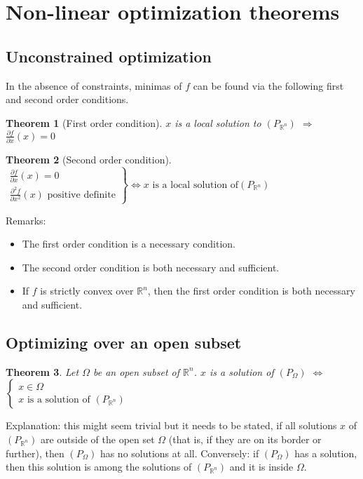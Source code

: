 \documentclass{article}
\newtheorem*{theorem}{Theorem}
\begin{document}
\section{Non-linear optimization theorems}

\subsection{Unconstrained optimization}
In the absence of constraints, minimas of $f$ can be found via the following first and second order conditions.

\begin{theorem}[First order condition]
$x$ is a local solution to $\left(P_{\mathbb{R}^n}\right)$ $\Rightarrow$
$\frac{\partial f}{\partial x}(x) = 0$
\end{theorem}

\begin{theorem}[Second order condition]
\begin{math}
\left.
\begin{array}{l}
\frac{\partial f}{\partial x}(x)=0\\
\frac{\partial^2 f}{\partial x^2}(x) \textrm{ positive definite}
\end{array}\right\} \Leftrightarrow x \textrm{ is a local solution of
}\left(P_{\mathbb{R}^n}\right)
\end{math}
\end{theorem}

\noindent Remarks:
\begin{itemize}
  \item The first order condition is a necessary condition.
  \item The second order condition is both necessary and sufficient.
  \item If $f$ is strictly convex over $\mathbb{R}^n$, then the first order condition is both necessary and sufficient.
\end{itemize}


\subsection{Optimizing over an open subset}

\begin{theorem}
Let $\Omega$ be an open subset of $\mathbb{R}^n$. $x$ is a solution of $\left(P_\Omega \right)$ $\Leftrightarrow$ 
\begin{math}
\left\{
\begin{array}{c}
x\in\Omega\\
x\textrm{ is a solution of }(P_{\mathbb{R}^n})
\end{array}\right.
\end{math}
\end{theorem}
\noindent Explanation: this might seem trivial but it needs to be stated, if all solutions $x$ of $(P_{\mathbb{R}^n})$ are outside of the open set $\Omega$ (that is, if they are on its border or further), then $\left(P_\Omega \right)$ has no solutions at all. Conversely: if $\left(P_\Omega \right)$ has a solution, then this solution is among the solutions of $(P_{\mathbb{R}^n})$ and it is inside $\Omega$.
\end{document}
